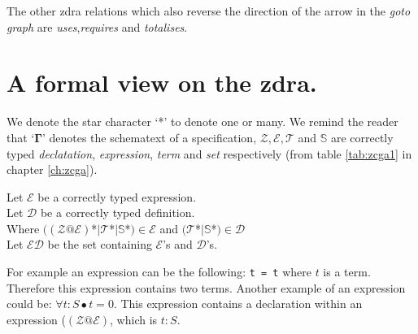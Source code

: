 The other \gls{zdra} relations which also reverse the direction of the arrow in the \emph{goto graph} are \emph{uses},\emph{requires} and \emph{totalises}.

\section{A formal view on the \gls{zdra}.}

We denote the star character `*' to denote one or many. We remind the reader that `$\mathbf{\Gamma}$' denotes the schematext of a specification, $\mathcal{Z}, \mathcal{E}, \mathcal{T}$ and $\mathbb{S}$ are correctly typed \emph{declatation}, \emph{expression}, \emph{term} and \emph{set} respectively (from table \ref{tab:zcga1} in chapter \ref{ch:zcga}).

\begin{defin}
Let $\mathcal{E}$ be a correctly typed expression. \\ Let $\mathcal{D}$ be a correctly typed definition. \\
Where $((\mathcal{Z}@\mathcal{E})$*$|\mathcal{T}$*$|\mathbb{S}$*$) \in \mathcal{E}$ and $(\mathcal{T}$*$|\mathbb{S}$*$) \in \mathcal{D}$\\
Let $\mathcal{ED}$ be the set containing $\mathcal{E}$'s and $\mathcal{D}$'s.
\end{defin}

For example an expression can be the following:
\verb|t = t| where $t$ is a term. Therefore this expression contains two terms. Another example of an expression could be:
$\forall t: S \bullet t = 0$. This expression contains a declaration within an expression ($(\mathcal{Z}@\mathcal{E})$, which is $t:S$.


